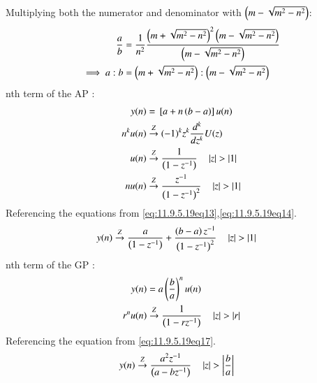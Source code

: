 \documentclass[journal,12pt,onecolumn]{IEEEtran}
\newcommand{\system}[1]{\stackrel{#1}{\rightarrow}}
\theoremstyle{remark}
\begin{document}
Multiplying both the numerator and denominator with $\left(m-\sqrt{m^2 - n^2}\right)$: 
\begin{align} 
\frac{a}{b} &= \frac{1}{n^2} \frac{\left(m + \sqrt{m^2 - n^2}\right)^2  \left(m-\sqrt{m^2 - n^2}\right)}{\left(m-\sqrt{m^2 - n^2}\right)}\label{eq:11.9.5.19eq9}\\
\implies a:b &= \left( m + \sqrt{m^2 - n^2}\right): \left(m - \sqrt{m^2 - n^2}\right)\label{eq:11.9.5.19eq10}
\end{align}
nth term of the AP :
\begin{align}
y(n)&=\sbrak{a+n\brak{b-a}}u(n)\label{eq:11.9.5.19eq11}\\
n^k u(n) &\system{Z} (-1)^k z^k \frac{d^k}{dz^k}U(z)\label{eq:11.9.5.19eq12}\\
u(n) &\system{Z} \frac{1}{\brak{1 - z^{-1}}} \quad \abs{ z} > \abs{1} \label{eq:11.9.5.19eq13}\\
nu(n) &\system{Z} \frac{z^{-1}}{\brak{1 - z^{-1}}^2} \quad \abs{ z} > \abs{1} \label{eq:11.9.5.19eq14}
\end{align}
Referencing the equations from \eqref{eq:11.9.5.19eq13},\eqref{eq:11.9.5.19eq14}.\\
\begin{align}
y(n) &\system{Z} \frac{a}{\brak{1 - z^{-1}}}+\frac{\brak{b-a}z^{-1}}{\brak{1-z^{-1}}^2} \quad \abs{ z} > \abs{1} \label{eq:11.9.5.19eq15}
\end{align}
nth term of the GP :
\begin{align}
y(n)&=a\brak{{\frac{b}{a}}}^n u(n)\label{eq:11.9.5.19eq16}\\
r^n u(n) &\system{Z} \frac{1}{\brak{1-rz^{-1}}} \quad \abs{ z} > \abs{r} \label{eq:11.9.5.19eq17}
\end{align}
Referencing the equation from \eqref{eq:11.9.5.19eq17}.\\
\begin{align}
y(n) &\system{Z} \frac{a^2 z^{-1}}{\brak{a-bz^{-1}}} \quad \abs{ z} > \abs{\frac{b}{a}}\label{eq:11.9.5.19eq18}
\end{align}
\end{document}
